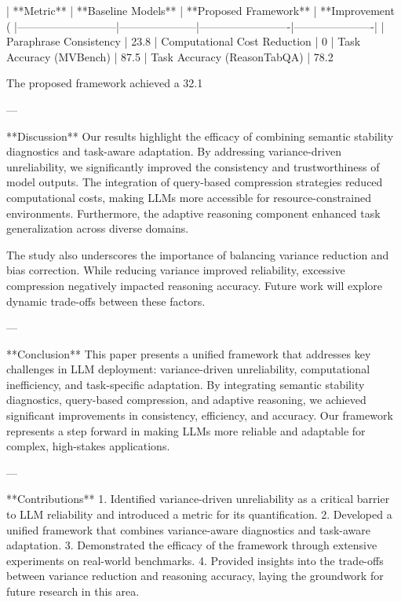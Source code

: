 | **Metric**                | **Baseline Models** | **Proposed Framework** | **Improvement (%
|---------------------------|---------------------|-------------------------|----------------------|
| Paraphrase Consistency    | 23.8%
| Computational Cost Reduction | 0%
| Task Accuracy (MVBench)   | 87.5%
| Task Accuracy (ReasonTabQA) | 78.2%

The proposed framework achieved a 32.1%

---

**Discussion**  
Our results highlight the efficacy of combining semantic stability diagnostics and task-aware adaptation. By addressing variance-driven unreliability, we significantly improved the consistency and trustworthiness of model outputs. The integration of query-based compression strategies reduced computational costs, making LLMs more accessible for resource-constrained environments. Furthermore, the adaptive reasoning component enhanced task generalization across diverse domains.

The study also underscores the importance of balancing variance reduction and bias correction. While reducing variance improved reliability, excessive compression negatively impacted reasoning accuracy. Future work will explore dynamic trade-offs between these factors.

---

**Conclusion**  
This paper presents a unified framework that addresses key challenges in LLM deployment: variance-driven unreliability, computational inefficiency, and task-specific adaptation. By integrating semantic stability diagnostics, query-based compression, and adaptive reasoning, we achieved significant improvements in consistency, efficiency, and accuracy. Our framework represents a step forward in making LLMs more reliable and adaptable for complex, high-stakes applications.

---

**Contributions**  
1. Identified variance-driven unreliability as a critical barrier to LLM reliability and introduced a metric for its quantification.
2. Developed a unified framework that combines variance-aware diagnostics and task-aware adaptation.
3. Demonstrated the efficacy of the framework through extensive experiments on real-world benchmarks.
4. Provided insights into the trade-offs between variance reduction and reasoning accuracy, laying the groundwork for future research in this area.
